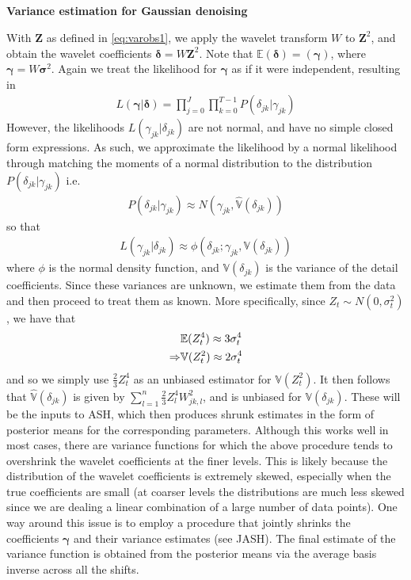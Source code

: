 \documentclass[12pt]{article}
\newcommand{\Gg}{\gamma}     \newcommand{\GG}{\Gamma}
\newcommand{\Gd}{\delta}     \newcommand{\GD}{\Delta}
\newcommand{\s}{\sigma}
\begin{document}
\begin{appendices}
\section{}\label{app:var estimation}\bigskip
\textbf{Variance estimation for Gaussian denoising}


With $\bm{Z}$ as defined in \eqref{eq:varobs1}, we apply the wavelet transform $W$ to $\bm{Z}^2$, and obtain the wavelet coefficients $\bm{\Gd}=W\bm{Z}^2$. Note that $\mathbb{E}(\bm{\Gd})=(\bm{\Gg})$, where $\bm{\Gg}=W\bm{\s}^2$. Again we treat the likelihood for $\bm{\Gg}$ as if it were independent, resulting in
\begin{eqnarray}
L(\bm{\Gg}|\bm{\Gd})=\prod_{j=0}^J\prod_{k=0}^{T-1}P(\Gd_{jk}|\Gg_{jk})
\end{eqnarray}
However, the likelihoods $L(\Gg_{jk}|\Gd_{jk})$ are not normal, and have no simple closed form expressions. As such, we approximate the likelihood by a normal likelihood through matching the moments of a normal distribution to the distribution $P(\Gd_{jk}|\Gg_{jk})$ i.e.
\begin{eqnarray}
P(\Gd_{jk}|\Gg_{jk})\approx N(\Gg_{jk},\hat{\mathbb{V}}(\Gd_{jk}))
\end{eqnarray}
so that
\begin{eqnarray}\label{eq:gaus approx}
L(\Gg_{jk}|\Gd_{jk})\approx \phi(\Gd_{jk};\Gg_{jk},\mathbb{V}(\Gd_{jk}))
\end{eqnarray}
where $\phi$ is the normal density function, and $\mathbb{V}(\Gd_{jk})$ is the variance of the detail coefficients. Since these variances are unknown, we estimate them from the data and then proceed to treat them as known. More specifically, since $Z_t\sim N(0,\s_t^2)$, we have that
\begin{eqnarray}
&\mathbb{E}(Z_t^4)\approx 3\s_t^4\notag\\
\label{eq:varvarest}\Rightarrow&\mathbb{V}(Z_t^2)\approx 2\s_t^4
\end{eqnarray}
and so we simply use $\frac{2}{3}Z_t^4$ as an unbiased estimator for $\mathbb{V}(Z_t^2)$. It then follows that $\hat{\mathbb{V}}(\Gd_{jk})$ is given by $\sum_{l=1}^n \frac{2}{3}Z_l^4W_{jk,l}^2$, and is unbiased for $\mathbb{V}(\Gd_{jk})$. These will be the inputs to ASH, which then produces shrunk estimates in the form of posterior means for the corresponding parameters. Although this works well in most cases, there are variance functions for which the above procedure tends to overshrink the wavelet coefficients at the finer levels. This is likely because the distribution of the wavelet coefficients is extremely skewed, especially when the true coefficients are small (at coarser levels the distributions are much less skewed since we are dealing a linear combination of a large number of data points). One way around this issue is to employ a procedure that jointly shrinks the coefficients $\bm{\Gg}$ and their variance estimates (see JASH). The final estimate of the variance function is obtained from the posterior means via the average basis inverse across all the shifts.


\end{appendices}
\end{document}
